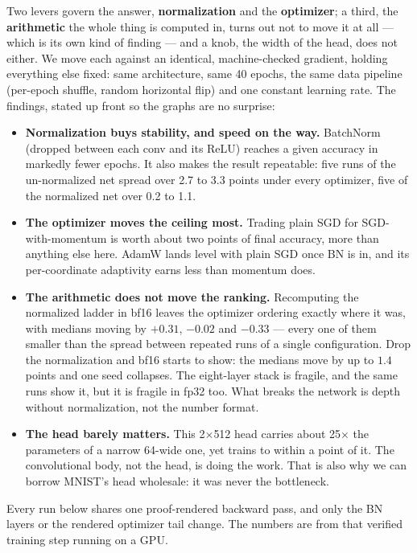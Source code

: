 Two levers govern the answer, \textbf{normalization} and the
\textbf{optimizer}; a third, the \textbf{arithmetic} the whole thing is
computed in, turns out not to move it at all --- which is its own kind of
finding --- and a knob, the width of the head, does not either. We move each against an identical, machine-checked
gradient, holding everything else fixed: same architecture, same 40
epochs, the same data pipeline (per-epoch shuffle, random horizontal
flip) and one constant learning rate. The findings,
stated up front so the graphs are no surprise:

\begin{itemize}
\item \textbf{Normalization buys stability, and speed on the way.}
  BatchNorm (dropped between each conv and its ReLU) reaches a given
  accuracy in markedly fewer epochs. It also makes the result
  repeatable: five runs of the un-normalized net spread over 2.7 to 3.3
  points under every optimizer, five of the normalized net over 0.2 to
  1.1.
\item \textbf{The optimizer moves the ceiling most.} Trading plain SGD
  for SGD-with-momentum is worth about two points of final accuracy,
  more than anything else here. AdamW lands level with plain SGD once
  BN is in, and its per-coordinate adaptivity earns less than momentum
  does.
\item \textbf{The arithmetic does not move the ranking.} Recomputing the
  normalized ladder in bf16 leaves the optimizer ordering exactly where it
  was, with medians moving by $+0.31$, $-0.02$ and $-0.33$ --- every one of
  them smaller than the spread between repeated runs of a single
  configuration. Drop the normalization and bf16 starts to show: the
  medians move by up to $1.4$ points and one seed collapses. The
  eight-layer stack is fragile, and the same runs show it, but it is
  fragile in fp32 too. What breaks the network is depth without
  normalization, not the number format.

\item \textbf{The head barely matters.} This 2$\times$512 head carries
  about 25$\times$ the parameters of a narrow 64-wide one, yet trains to
  within a point of it. The convolutional body, not the head,
  is doing the work. That is also why we can borrow MNIST's head
  wholesale: it was never the bottleneck.
\end{itemize}

\noindent Every run below shares one proof-rendered backward pass, and
only the BN layers or the rendered optimizer tail change. The numbers are
from that verified training step running on a GPU.

